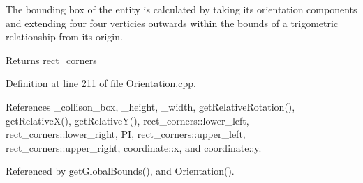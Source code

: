 The bounding box of the entity is calculated by taking its orientation components and extending four four verticies outwards within the bounds of a trigometric relationship from its origin. \begin{DoxyReturn}{Returns}
\hyperlink{structrect__corners}{rect\-\_\-corners} 
\end{DoxyReturn}


Definition at line 211 of file Orientation.\-cpp.



References \-\_\-collison\-\_\-box, \-\_\-height, \-\_\-width, get\-Relative\-Rotation(), get\-Relative\-X(), get\-Relative\-Y(), rect\-\_\-corners\-::lower\-\_\-left, rect\-\_\-corners\-::lower\-\_\-right, P\-I, rect\-\_\-corners\-::upper\-\_\-left, rect\-\_\-corners\-::upper\-\_\-right, coordinate\-::x, and coordinate\-::y.



Referenced by get\-Global\-Bounds(), and Orientation().


